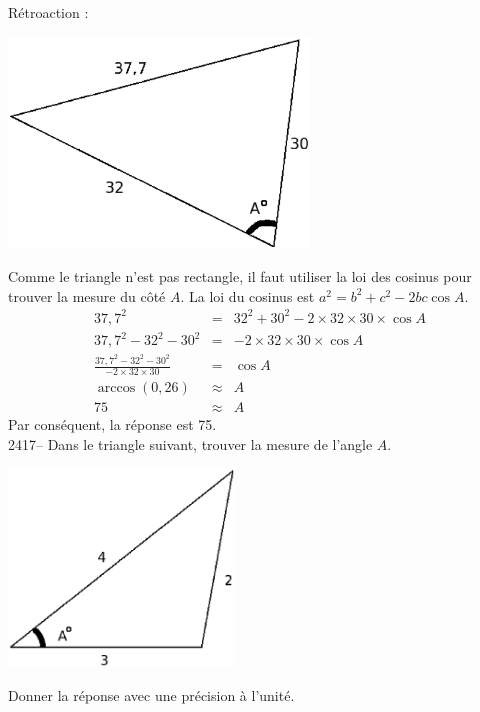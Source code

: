 \documentclass[letterpaper, 12pt]{article}
\begin{document}
R\'etroaction :\\
\begin{center}
 \includegraphics[width=8cm,bb=0 491 494 842]{Q2416.eps}
\end{center}
Comme le triangle n'est pas rectangle, il faut utiliser la loi des cosinus pour trouver la mesure du c\^ot\'e $A$. La loi du cosinus est $a^{2}=b^{2}+c^{2}-2bc\cos{A}$.
\begin{eqnarray*}
 37,7^{2} &=& 32^{2} + 30^{2} - 2 \times 32 \times 30 \times \cos{A}\\[2mm]
 37,7^{2}- 32^{2} - 30^{2}&=&  - 2 \times 32 \times 30 \times \cos{A}\\[2mm]
\frac{ 37,7^{2}- 32^{2} - 30^{2}}{- 2 \times 32 \times 30 }&=& \cos{A}\\[2mm]
\arccos{(0,26)}&\approx& A\\[2mm]
75&\approx& A
\end{eqnarray*}
Par cons\'equent, la r\'eponse est 75.\\

2417-- Dans le triangle suivant, trouver la mesure de l'angle $A$.\\
\begin{center}
 \includegraphics[width=6cm,bb=0 491 494 842]{Q2417.eps}
\end{center}
Donner la r\'eponse avec une pr\'ecision \`a l'unit\'e.\\
\end{document}
